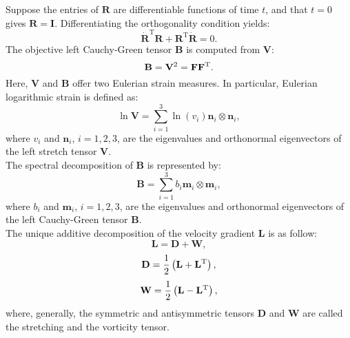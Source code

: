 Suppose the entries of $\mathbf{R}$ are differentiable functions of time $t$, and that $t = 0$ gives $\mathbf{R} = \mathbf{I}$. Differentiating the orthogonality condition yields:
\begin{equation}
\dot{\mathbf{R}}^\mathrm{T} \mathbf{R} + \mathbf{R}^\mathrm{T} \dot{\mathbf{R}} = 0.
\end{equation}
The objective left Cauchy-Green tensor ${\mathbf{B}}$ is computed from ${\mathbf{V}}$:
\begin{equation}
{\mathbf{B}} = {{\mathbf{V}}^2} = {\mathbf{F}}{{\mathbf{F}}^{\rm{T}}}.
\end{equation}
Here, $\mathbf{V}$ and $\mathbf{B}$ offer two Eulerian strain measures. In particular, Eulerian logarithmic strain is defined as:
\begin{equation}
\ln {\mathbf{V}} = \sum\limits_{i = 1}^3 {\ln \left( {{v _i}} \right)} {{\mathbf{n}}_i} \otimes {{\mathbf{n}}_i},
\end{equation}
where $v_i$ and ${\mathbf{n}}_i$, $i=1,2,3$, are the eigenvalues and orthonormal eigenvectors of the left stretch tensor $\mathbf{V}$.\\
The spectral decomposition of $\mathbf{B}$ is represented by:
\begin{equation}
{\mathbf{B}} = \sum\limits_{i = 1}^3 {{b_i}{{\mathbf{m}}_i} \otimes {{\mathbf{m}}_i}},
\end{equation}
where $b_i$ and ${\mathbf{m}}_i$, $i=1,2,3$, are the eigenvalues and orthonormal eigenvectors of the left Cauchy-Green tensor $\mathbf{B}$.\\
The unique additive decomposition of the velocity gradient $\mathbf{L}$ is as follow:
\begin{equation}
{\mathbf{L}} = {\mathbf{D}} + {\mathbf{W}},
\end{equation}
\begin{equation}
{\mathbf{D}} = \frac{1}{2}\left( {{\mathbf{L}} + {{\mathbf{L}}^{\rm{T}}}} \right),
\end{equation}
\begin{equation}
{\mathbf{W}} = \frac{1}{2}\left( {{\mathbf{L}} - {{\mathbf{L}}^{\rm{T}}}} \right),
\end{equation}
where, generally, the symmetric and antisymmetric tensors $\mathbf{D}$ and $\mathbf{W}$ are called the stretching and the vorticity tensor.

